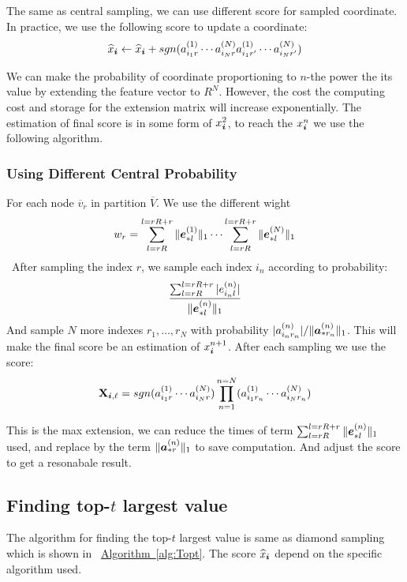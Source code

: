 \documentclass[letterpaper]{article}
\newcommand{\Sca}[3]{{#1}^{(#2)}_{i_#2#3}}%
\newcommand{\V}[1]{{\bm{{\MakeLowercase{#1}}}}}
\newcommand{\VnC}[3]{\V{#1}^{(#2)}_{#3}}
\newcommand{\Nrocl}[2]{\norm{\VnC{a}{#1}{*#2}}{1}}
\newcommand{\M}[1]{{\bm{\mathbf{\MakeUppercase{#1}}}}}
\newcommand{\norm}[2]{\|#1\|_{#2}}
\newcommand{\Alg}[1] {\hyperref[alg:#1] {Algorithm~\ref*{alg:#1}}}
\begin{document}
The same as central sampling, we can use different score for sampled coordinate. In practice, we use the following score to update a coordinate:
\[
\widehat{x}_{\V{i}} \leftarrow \widehat{x}_{\V{i}} +sgn(\Sca{a}{1}{r}\cdots\Sca{a}{N}{r}\Sca{a}{1}{r'}\cdots\Sca{a}{N}{r'})
\]

We can make the probability of coordinate proportioning to $n$-the power the its value by extending the feature vector to $R^N$. However, the cost the computing cost and storage for the extension matrix will increase exponentially.
The estimation of final score is in some form of $x^2_{\V{i}}$, to reach the $x^n_{\V{i}}$ we use the following algorithm.

\subsubsection{Using Different Central Probability}
For each node $\overline{v}_r$ in partition $\overline{V}$. We use the different wight
\[
w_r = \sum_{l=rR}^{l=rR+r}\norm{\VnC{e}{1}{*l}}{1}
\cdots\sum_{l=rR}^{l=rR+r}\norm{\VnC{e}{N}{*l}}{1}
\]\
After sampling the index $r$, we sample each index $i_n$ according to probability:
\[
\frac{\sum_{l=rR}^{l=rR+r}|e^{(n)}_{i_nl}|}{\norm{\VnC{e}{n}{*l}}{1}}
\]
And sample $N$ more indexes $r_1,\ldots,r_N$ with probability $|\Sca{a}{n}{r_n}|/\norm{\VnC{a}{n}{*r_n}}{1}$.
This will make the final score be an estimation of  $x^{n+1}_{\V{i}}$.
After each sampling we use the score:
\[
\M{X}_{\V{i},\ell} = sgn(\Sca{a}{1}{r}\cdots\Sca{a}{N}{r})\prod_{n=1}^{n=N}(\Sca{a}{1}{r_n}\cdots\Sca{a}{N}{r_n})
\]

This is the max extension, we can reduce the times of term $\sum_{l=rR}^{l=rR+r}\norm{\VnC{e}{n}{*l}}{1}$ used, and replace by the term $\Nrocl{n}{r}$ to save computation. And adjust the score to get a resonabale result.
\subsection{Finding top-$t$ largest value}

The algorithm for finding the top-$t$ largest value is same as diamond sampling which is shown in ~\Alg{Topt}. The score $\widehat{x}_\V{i}$ depend on the specific algorithm used.
\end{document}
